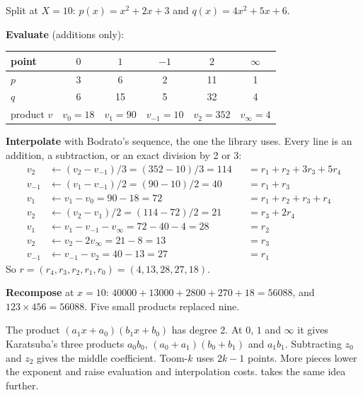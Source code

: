 \begin{example}
Split at $X = 10$: $p(x) = x^2 + 2x + 3$ and $q(x) = 4x^2 + 5x + 6$.

\textbf{Evaluate} (additions only):
\begin{center}
\begin{tabular}{lccccc}
\toprule
point & $0$ & $1$ & $-1$ & $2$ & $\infty$ \\
\midrule
$p$ & 3 & 6 & 2 & 11 & 1 \\
$q$ & 6 & 15 & 5 & 32 & 4 \\
\midrule
product $v$ & $v_0 = 18$ & $v_1 = 90$ & $v_{-1} = 10$ & $v_2 = 352$ & $v_\infty = 4$ \\
\bottomrule
\end{tabular}
\end{center}

\textbf{Interpolate} with Bodrato's sequence, the one the library uses. Every line is an
addition, a subtraction, or an exact division by 2 or 3:
\begin{align*}
v_2 &\leftarrow (v_2 - v_{-1})/3 = (352 - 10)/3 = 114 && = r_1 + r_2 + 3r_3 + 5r_4\\
v_{-1} &\leftarrow (v_1 - v_{-1})/2 = (90 - 10)/2 = 40 && = r_1 + r_3\\
v_1 &\leftarrow v_1 - v_0 = 90 - 18 = 72 && = r_1 + r_2 + r_3 + r_4\\
v_2 &\leftarrow (v_2 - v_1)/2 = (114 - 72)/2 = 21 && = r_3 + 2 r_4\\
v_1 &\leftarrow v_1 - v_{-1} - v_\infty = 72 - 40 - 4 = 28 && = r_2\\
v_2 &\leftarrow v_2 - 2 v_\infty = 21 - 8 = 13 && = r_3\\
v_{-1} &\leftarrow v_{-1} - v_2 = 40 - 13 = 27 && = r_1
\end{align*}
So $r = (r_4, r_3, r_2, r_1, r_0) = (4, 13, 28, 27, 18)$.

\textbf{Recompose} at $x = 10$: $40000 + 13000 + 2800 + 270 + 18 = 56088$, and
$123 \times 456 = 56088$. Five small products replaced nine.
\end{example}

\begin{another}
The product $(a_1x + a_0)(b_1x + b_0)$ has degree 2. At $0$, $1$ and $\infty$ it
gives Karatsuba's three products $a_0b_0$, $(a_0 + a_1)(b_0 + b_1)$ and $a_1b_1$.
Subtracting $z_0$ and $z_2$ gives the middle coefficient. Toom-$k$ uses $2k-1$
points. More pieces lower the exponent and raise evaluation and interpolation
costs.  takes the same idea further.
\end{another}

